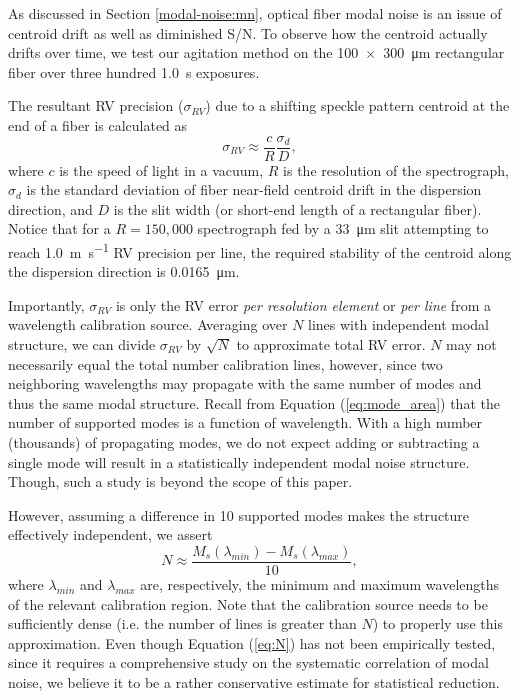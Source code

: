 As discussed in Section \ref{modal-noise:mn}, optical fiber modal noise is an issue of centroid drift as well as diminished S/N. To observe how the centroid actually drifts over time, we test our agitation method on the \SI{100x300}{\micro\meter} rectangular fiber over three hundred \SI{1.0}{\second} exposures.

The resultant RV precision ($\sigma_{RV}$) due to a shifting speckle pattern centroid at the end of a fiber is calculated as
\begin{equation}
\sigma_{RV} \approx \frac{c}{R} \frac{\sigma_d}{D},
\label{eq:rv_error}
\end{equation}
where $c$ is the speed of light in a vacuum, $R$ is the resolution of the spectrograph, $\sigma_d$ is the standard deviation of fiber near-field centroid drift in the dispersion direction, and $D$ is the slit width (or short-end length of a rectangular fiber). Notice that for a $R=150,000$ spectrograph fed by a \SI{33}{\micro\meter} slit attempting to reach \SI{1.0}{\meter\per\second} RV precision per line, the required stability of the centroid along the dispersion direction is \SI{0.0165}{\micro\meter}.

Importantly, $\sigma_{RV}$ is only the RV error \textit{per resolution element} or \textit{per line} from a wavelength calibration source. Averaging over $N$ lines with independent modal structure, we can divide $\sigma_{RV}$ by $\sqrt{N}$ to approximate total RV error. $N$ may not necessarily equal the total number calibration lines, however, since two neighboring wavelengths may propagate with the same number of modes and thus the same modal structure. Recall from Equation (\ref{eq:mode_area}) that the number of supported modes is a function of wavelength. With a high number (thousands) of propagating modes, we do not expect adding or subtracting a single mode will result in a statistically independent modal noise structure. Though, such a study is beyond the scope of this paper.

However, assuming a difference in 10 supported modes makes the structure effectively independent, we assert
\begin{equation}
N \approx \frac{M_s(\lambda_{min}) - M_s(\lambda_{max})}{10},
\label{eq:N}
\end{equation}
where $\lambda_{min}$ and $\lambda_{max}$ are, respectively, the minimum and maximum wavelengths of the relevant calibration region. Note that the calibration source needs to be sufficiently dense (i.e. the number of lines is greater than $N$) to properly use this approximation. Even though Equation (\ref{eq:N}) has not been empirically tested, since it requires a comprehensive study on the systematic correlation of modal noise, we believe it to be a rather conservative estimate for statistical reduction.

